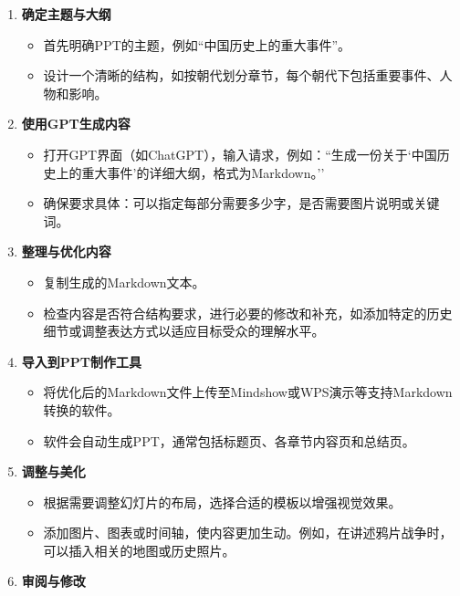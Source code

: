 \begin{enumerate}
\def\labelenumi{\arabic{enumi}.}

\item
  \textbf{确定主题与大纲}

  \begin{itemize}
  
  \item
    首先明确PPT的主题，例如``中国历史上的重大事件''。
  \item
    设计一个清晰的结构，如按朝代划分章节，每个朝代下包括重要事件、人物和影响。
  \end{itemize}
\item
  \textbf{使用GPT生成内容}

  \begin{itemize}
  
  \item
    打开GPT界面（如ChatGPT），输入请求，例如：``生成一份关于`中国历史上的重大事件'的详细大纲，格式为Markdown。''
  \item
    确保要求具体：可以指定每部分需要多少字，是否需要图片说明或关键词。
  \end{itemize}
\item
  \textbf{整理与优化内容}

  \begin{itemize}
  
  \item
    复制生成的Markdown文本。
  \item
    检查内容是否符合结构要求，进行必要的修改和补充，如添加特定的历史细节或调整表达方式以适应目标受众的理解水平。
  \end{itemize}
\item
  \textbf{导入到PPT制作工具}

  \begin{itemize}
  
  \item
    将优化后的Markdown文件上传至Mindshow或WPS演示等支持Markdown转换的软件。
  \item
    软件会自动生成PPT，通常包括标题页、各章节内容页和总结页。
  \end{itemize}
\item
  \textbf{调整与美化}

  \begin{itemize}
  
  \item
    根据需要调整幻灯片的布局，选择合适的模板以增强视觉效果。
  \item
    添加图片、图表或时间轴，使内容更加生动。例如，在讲述鸦片战争时，可以插入相关的地图或历史照片。
  \end{itemize}
\item
  \textbf{审阅与修改}


\end{enumerate}
